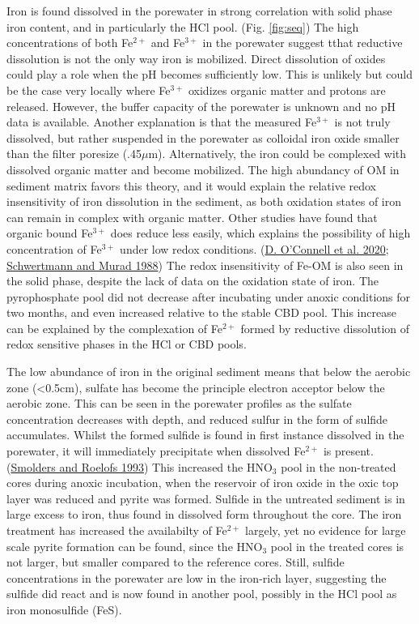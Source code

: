 \documentclass[a4paper,11pt]{article}
\begin{document}
Iron is found dissolved in the porewater in strong correlation with solid phase iron content, and in particularly the HCl pool. (Fig. \ref{fig:seq}) The high concentrations of both Fe\(^{2+}\) and Fe\(^{3+}\) in the porewater suggest tthat reductive dissolution is not the only way iron is mobilized. Direct dissolution of oxides could play a role when the pH becomes sufficiently low. This is unlikely but could be the case very locally where Fe\(^{3+}\) oxidizes organic matter and protons are released. However, the buffer capacity of the porewater is unknown and no pH data is available. Another explanation is that the measured Fe\(^{3+}\) is not truly dissolved, but rather suspended in the porewater as colloidal iron oxide smaller than the filter poresize (.45\(\mu\)m). Alternatively, the iron could be complexed with dissolved organic matter and become mobilized. The high abundancy of OM in sediment matrix favors this theory, and it would explain the relative redox insensitivity of iron dissolution in the sediment, as both oxidation states of iron can remain in complex with organic matter. Other studies have found that organic bound Fe\(^{3+}\) does reduce less easily, which explains the possibility of high concentration of Fe\(^{3+}\) under low redox conditions. (\protect\hyperlink{ref-oconnellChangesSedimentaryPhosphorus2020}{D. O'Connell et al. 2020}; \protect\hyperlink{ref-schwertmannNatureIronOxide1988}{Schwertmann and Murad 1988}) The redox insensitivity of Fe-OM is also seen in the solid phase, despite the lack of data on the oxidation state of iron. The pyrophosphate pool did not decrease after incubating under anoxic conditions for two months, and even increased relative to the stable CBD pool. This increase can be explained by the complexation of Fe\(^{2+}\) formed by reductive dissolution of redox sensitive phases in the HCl or CBD pools.

The low abundance of iron in the original sediment means that below the aerobic zone (\textless0.5cm), sulfate has become the principle electron acceptor below the aerobic zone. This can be seen in the porewater profiles as the sulfate concentration decreases with depth, and reduced sulfur in the form of sulfide accumulates. Whilst the formed sulfide is found in first instance dissolved in the porewater, it will immediately precipitate when dissolved Fe\(^{2+}\) is present. (\protect\hyperlink{ref-smoldersSulphatemediatedIronLimitation1993}{Smolders and Roelofs 1993}) This increased the HNO\(_3\) pool in the non-treated cores during anoxic incubation, when the reservoir of iron oxide in the oxic top layer was reduced and pyrite was formed. Sulfide in the untreated sediment is in large excess to iron, thus found in dissolved form throughout the core. The iron treatment has increased the availabilty of Fe\(^{2+}\) largely, yet no evidence for large scale pyrite formation can be found, since the HNO\(_3\) pool in the treated cores is not larger, but smaller compared to the reference cores. Still, sulfide concentrations in the porewater are low in the iron-rich layer, suggesting the sulfide did react and is now found in another pool, possibly in the HCl pool as iron monosulfide (FeS).
\end{document}
